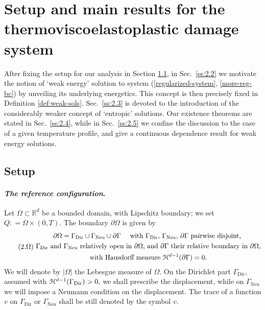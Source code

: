 \documentclass[a4paper,10pt,reqno]{amsart}
\numberwithin{equation}{section}
\newcommand{\R}{\mathbb{R}}
\numberwithin{equation}{section}
\newcommand{\Dir}{\mathrm{Dir}}
\newcommand{\Neu}{\mathrm{Neu}}
\newcommand{\EEE}{\color{black}}
\newcommand{\MMM}{\color{black}}%
\begin{document}
\section{\bf Setup and main results for the thermoviscoelastoplastic damage system}
\label{s:2}
\noindent
After fixing the setup for our analysis in Section \ref{ss:2.1}, in Sec.\ \ref{ss:2.2} we motivate the notion of `weak energy' solution to system 
(\ref{regularized-system}, \ref{more-reg-bc}) by unveiling its underlying energetics. This concept is then precisely fixed in Definition \ref{def:weak-sols}. Sec.\ \ref{ss:2.3} is devoted to the introduction of the considerably weaker concept of `entropic' solutions. Our existence theorems are stated in Sec.\ \ref{ss:2.4}, while in Sec.\ \ref{ss:2.5} we confine the discussion to the  \MMM case of a  given %
temperature profile, \EEE   and give a continuous dependence result for weak energy solutions. 
\subsection{Setup}
\label{ss:2.1}
\paragraph{{\em The reference configuration}.} 
Let $\Omega \subset \R^d$ be a bounded domain, with Lipschitz boundary; we set $Q: =  \Omega  \times  (0,T) $.
 The boundary $\partial\Omega $ is given by  
\begin{equation}
\label{Omega-s2}
\tag{2.$\Omega$}
\begin{gathered}
\partial \Omega = \Gamma_\Dir \cup
\Gamma_\Neu \cup \partial\Gamma \quad \text{ with $\Gamma_\Dir, \,\Gamma_\Neu, \, \partial\Gamma$ pairwise disjoint,}
\\
\text{
 $\Gamma_\Dir$ and $\Gamma_\Neu$ relatively open in $\partial\Omega$, and $ \partial\Gamma$ their relative boundary in $\partial\Omega$,}
 \\
\text{
  with Hausdorff measure $\calH^{d-1}(\partial\Gamma)=0$.}
  \end{gathered}
  \end{equation}
  We will denote by $|\Omega|$ the Lebesgue measure of $\Omega$. 
  On the Dirichlet part $\Gamma_\Dir$, assumed  with $\calH^{d-1}(\Gamma_\Dir)>0, $   we shall prescribe the displacement, while on $\Gamma_\Neu$ we will impose a Neumann condition on the displacement.  The trace of a function $v$ on $\Gamma_\Dir$ or $\Gamma_\Neu$ shall be still  denoted by the symbol $v$. 
\end{document}
